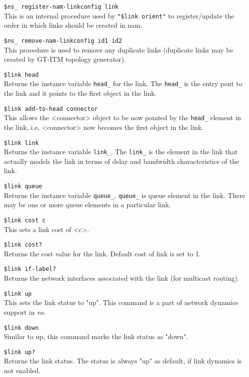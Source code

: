\begin{flushleft}
{\tt \$ns\_ register-nam-linkconfig \<link\>}\\
This is an internal procedure used by {\tt "\$link orient"} to 
register/update the order in which links should be created in nam.


{\tt \$ns\_ remove-nam-linkconfig \<id1\> \<id2\>}\\
This procedure is used to remove any duplicate links (duplicate links may be
created by GT-ITM topology generator).


{\tt \$link head}\\
Returns the instance variable {\tt head\_} for the link. The {\tt head\_} is
the entry pont to the link and it points to the first object in the link.


{\tt \$link add-to-head \<connector\>}\\
This allows the <connector> object to be now pointed by the {\tt head\_}
element in the link, i.e, <connector> now becomes the first object in the
link.


{\tt \$link link}\\
Returns the instance variable {\tt link\_}. The {\tt link\_} is the element
in the link that actually models the link in terms of delay and bandwidth
characteristics of the link.


{\tt \$link queue}\\
Returns the instance variable {\tt queue\_}. {\tt queue\_} is queue element
in the link. There may be one or more queue elements in a particular link.


{\tt \$link cost \<c\>}\\
This sets a link cost of <c>.


{\tt \$link cost?}\\
Returns the cost value for the link. Default cost of link is set to 1.


{\tt \$link if-label?}\\
Returns the network interfaces associated with the link (for multicast routing).


{\tt \$link up}\\
This sets the link status to "up". This command is a part of network
dynamics support in \emph{ns}.


{\tt \$link down}\\
Similar to up, this command marks the link status as "down".


{\tt \$link up?}\\
Returns the link status. The status is always "up" as default, if link
dynamics is not enabled.



\end{flushleft}
